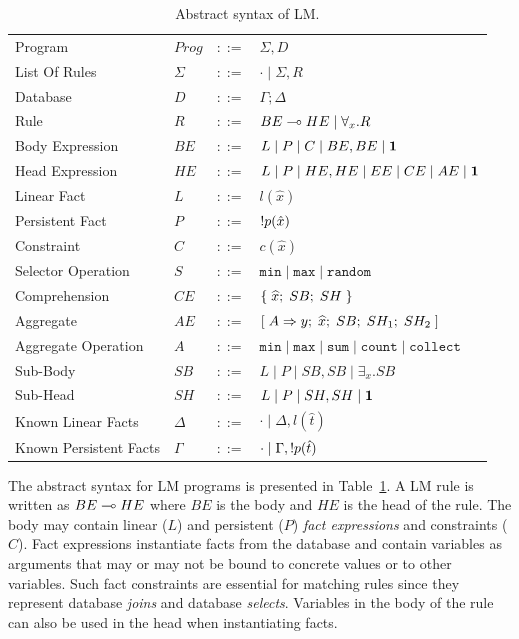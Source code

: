 \begin{table}[h]
\centering
\begin{tabular}{ l l c l }
  Program & $Prog$ & $::=$ & $\Sigma, D$ \\
  List Of Rules & $\Sigma$ & $::=$ & $\cdot \; | \; \Sigma, R$\\
  Database & $D$ & $::=$ & $\Gamma; \Delta$ \\
  Rule & $R$ & $::=$ & $BE \multimap HE \; | \; \forall_{x}. R$ \\
  Body Expression & $BE$ & $::=$ & $L \; | \; P \; | \; C \; | \; BE, BE \; | \; \mathbf{1}$\\
  Head Expression & $HE$ & $::=$ & $L \; | \; P \; | \; HE, HE \; | \; EE \; |
  \; CE \; | \; AE \; | \; \mathbf{1}$\\
  
  Linear Fact & $L$ & $::=$ & $l(\hat{x})$\\
  Persistent Fact & $P$ & $::=$ & ${!} p(\hat{x})$\\
  Constraint & $C$ & $::=$ & $c(\hat{x})$ \\
  Selector Operation & $S$ & $::=$ & $\mathtt{min} \; | \; \mathtt{max} \; | \; \mathtt{random}$\\
  
  Comprehension & $CE$ & $::=$ & $\{ \; \widehat{x}; \; SB; \; SH \; \}$ \\

  Aggregate & $AE$ & $::=$ & $[\; A \Rightarrow y; \; \widehat{x}; \; SB; \; SH_1; \; SH_2 \;]$ \\
  Aggregate Operation & $A$ & $::=$ & $\mathtt{min} \; | \; \mathtt{max} \; | \;
\mathtt{sum} \; | \; \mathtt{count} \; | \; \mathtt{collect}$ \\
  
  Sub-Body & $SB$ & $::=$ & $L \; | \; P \; | \; SB, SB \; | \; \exists_{x}. SB$\\
  Sub-Head & $SH$ & $::=$ & $L \; | \; P \; | \; SH, SH \; | \; \mathbf{1}$\\
  
  Known Linear Facts & $\Delta$ & $::=$ & $\cdot \; | \; \Delta, l(\hat{t})$ \\
  Known Persistent Facts & $\Gamma$ & $::=$ & $\cdot \; | \; \Gamma, {!} p(\hat{t})$ \\
\end{tabular}
\caption{Abstract syntax of LM.}\label{tbl:ast}
\end{table}

The abstract syntax for LM programs is presented in Table~\ref{tbl:ast}.  A LM
rule is written as $BE \multimap HE$ where $BE$ is the body and $HE$ is the head of
the rule. The body may contain linear ($L$) and persistent ($P$) \emph{fact
   expressions} and constraints ($C$). Fact expressions instantiate facts from
   the database and contain variables as arguments that may or may not be bound
   to concrete values or to other variables. Such fact constraints are essential
   for matching rules since they represent database \emph{joins} and database
   \emph{selects}. Variables in the body of the rule can also be used in the
   head when instantiating facts.

